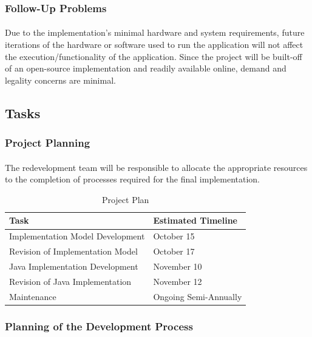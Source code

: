 \documentclass[12pt, titlepage]{article}
\begin{document}
\subsubsection{Follow-Up Problems}
\paragraph{}
Due to the implementation's minimal hardware and system requirements, future iterations of the hardware or software used to run the application will not affect the execution/functionality of the application. Since the project will be built-off of an open-source implementation and readily available online, demand and legality concerns are minimal.

\subsection{Tasks}

\subsubsection{Project Planning}
\paragraph{}
The redevelopment team will be responsible to allocate the appropriate resources to the completion of processes required for the final implementation.\\
\begin{table}[H]
\caption{Project Plan} \label{tab:plan}
\begin{center}
\begin{tabular}{| l | l |}
\hline
\textbf{Task} & \textbf{Estimated Timeline} \\ \hline
Implementation Model Development & October 15 \\ \hline
Revision of Implementation Model & October 17 \\ \hline
Java Implementation Development & November 10 \\ \hline
Revision of Java Implementation & November 12 \\ \hline
Maintenance & Ongoing Semi-Annually \\
\hline
\end{tabular}
\end{center}
\end{table}

\subsubsection{Planning of the Development Process}
\end{document}
